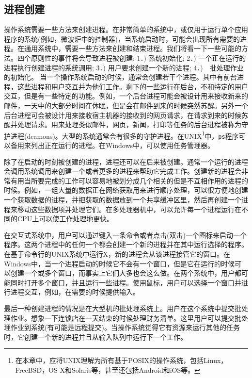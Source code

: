 	\subsection{进程创建}
	
	操作系统需要一些方法来创建进程。在非常简单的系统中，或仅用于运行单个应用程序的系统(例如，微波炉中的控制器)，当系统启动时，可能会出现所有需要的进程。在通用系统中，需要一些方法来创建和结束进程。我们将看一下一些可能的方法。四个原则性的事件将会导致进程被创建:
		1．) 系统初始化;
		2．) 一个正在运行的进程执行创建进程的系统调用;
		3．)	用户要求创建一个新的进程;
		4．)　批处理作业的初始化。
	当一个操作系统启动的时候，通常会创建若干个进程。其中有前台进程，这些进程和用户交互并为他们工作。剩下的一些运行在后台，不和特定的用户交互，但是有一些特定的功能。例如，一个后台进程可能会被设计用来接收新来的邮件，一天中的大部分时间在休眠，但是会在邮件到来的时候突然苏醒。另外一个后台进程可会被设计用来接收宿主机器的接收到的网页请求，在请求到来的时候苏醒并处理请求。用来处理类似邮件，网页，新闻，打印等任务的后台进程被称为守护进程(deamons)。大型的系统通常会有很多的守护进程。在UNIX\footnote{在本章中，应将UNIX理解为所有基于POSIX的操作系统，包括Linux，FreeBSD，OS X和Solaris等，甚至还包括Android和iOS等。}中，\texttt{ps}程序可以备用来列出正在运行的进程。在Windows中，可以使用任务管理器。
	
	除了在启动的时刻被创建的进程，进程还可以在后来被创建。通常一个运行的进程会调用系统调用来创建一个或者更多的进程来帮助它完成工作。创建新的进程会非常有用当所要完成的工作可以容易地被划分成几个相关的但是不互相作用的进程的时候。例如，一组大量的数据正在网络获取用来进行顺序处理，可以很方便地创建一个获取数据的进程，并把获取的数据放到一个共享缓冲区里，然后再创建一个进程来移动这些数据项并处理它们。在多处理器机中，可以允许每一个进程运行在不同的CPU上可以使工作处理地更快。
	
	在交互式系统中，用户可以通过键入一条命令或者点击(双击)一个图标来启动一个程序。这两个进程中的任何一个都会创建一个新的进程并在其中运行选择的程序。在基于命令行的UNIX系统中运行X，新的进程会从该进程接管它的窗口。在Windows中，当一个进程启动的时候它不会有一个窗口，但是它在运行的时候可以创建一个或多个窗口，而事实上它们大多也会这么做。在两个系统中，用户都可能同时打开多个窗口，并且运行一些进程。使用鼠标，用户可以选择一个窗口并进行进程交互，例如，在需要的时候提供输入。
	
	最后一种创建进程的情况是在大型机的批处理系统上。用户在这个系统中提交批处理作业。想象一下连锁店在一天结束的时候处理财务清单。这里用户可以提交批处理作业到系统(有可能是远程提交)。当操作系统觉得它有资源来运行其他的任务时，它创建一个新的进程并且从输入队列中运行下一个工作。
	
